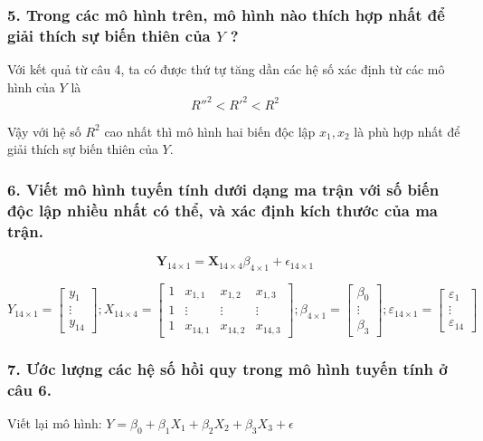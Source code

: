 \documentclass[a4paper]{article}
\theoremstyle{nonumberplain}
\begin{document}
\subsubsection*{5. Trong các mô hình trên, mô hình nào thích hợp nhất để giải thích sự biến thiên của $Y$ ?}

Với kết quả từ câu 4, ta có được thứ tự tăng dần các hệ số xác định từ các mô hình của $Y$ là \[R''^2 < R'^2 < R^2 \]

Vậy với hệ số $R^2$ cao nhất thì mô hình hai biến độc lập $x_1, x_2$ là phù hợp nhất để giải thích sự biến thiên của $Y$.


\subsubsection*{6. Viết mô hình tuyến tính dưới dạng ma trận với số biến độc lập nhiều nhất có thể, và xác định kích thước của ma trận.}

$$\mathbf{Y}_{14\times1} = \mathbf{X}_{14\times4}\beta_{4\times1} + \epsilon_{14\times1}$$

\[{Y_{14 \times 1}} = \left[ {\begin{array}{*{20}{c}}
  {{y_1}} \\ 
   \vdots  \\ 
  {{y_{14}}} 
\end{array}} \right];{X_{14 \times 4}} = \left[ {\begin{array}{*{20}{c}}
  1&{{x_{1,1}}}&{{x_{1,2}}}&{{x_{1,3}}} \\ 
  1& \vdots & \vdots & \vdots  \\ 
  1&{{x_{14,1}}}&{{x_{14,2}}}&{{x_{14,3}}} 
\end{array}} \right];{\beta _{4 \times 1}} = \left[ {\begin{array}{*{20}{c}}
  {{\beta _0}} \\ 
   \vdots  \\ 
  {{\beta _3}} 
\end{array}} \right];{\varepsilon _{14 \times 1}} = \left[ {\begin{array}{*{20}{c}}
  {{\varepsilon _1}} \\ 
   \vdots  \\ 
  {{\varepsilon _{14}}} 
\end{array}} \right]\]

\subsubsection*{7. Ước lượng các hệ số hồi quy trong mô hình tuyến tính ở câu 6.}
Viết lại mô hình: $Y = \beta_0 + \beta_1 X_1 + \beta_2 X_2 + \beta_3 X_3 + \epsilon$
\end{document}
